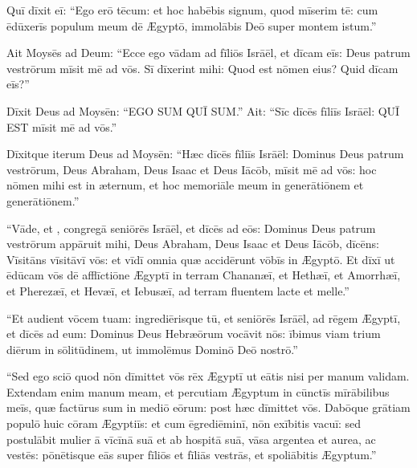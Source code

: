 Quī dīxit eī: ``Ego erō tēcum: et hoc habēbis signum,
quod mīserim tē: cum ēdūxerīs populum meum dē Ægyptō,
immolābis Deō super montem istum.''

Ait Moysēs ad Deum: ``Ecce ego vādam ad fīliōs Isrāēl,
et dīcam eīs: Deus patrum vestrōrum mīsit mē ad vōs.
Sī dīxerint mihi: Quod est nōmen eius? Quid dīcam eīs?''

Dīxit Deus ad Moysēn: ``EGO SUM QUĪ SUM.'' Ait: ``Sīc dīcēs fīliīs Isrāēl: QUĪ EST mīsit mē ad vōs.''

Dīxitque iterum Deus ad Moysēn: ``Hæc dīcēs fīliīs Isrāēl:
Dominus Deus patrum vestrōrum, Deus Abraham, Deus Isaac et Deus Iācōb,
 mīsit mē ad vōs: hoc nōmen mihi est in æternum,
et hoc memoriāle meum in generātiōnem et generātiōnem.''

``Vāde, et , congregā seniōrēs Isrāēl,
et dīcēs ad eōs: Dominus Deus patrum vestrōrum appāruit mihi,
Deus Abraham, Deus Isaac et Deus Iācōb,
dīcēns: Vīsitāns vīsitāvī vōs: et vīdī omnia quæ accidērunt vōbīs in Ægyptō.
Et dīxī ut ēdūcam vōs dē afflīctiōne Ægyptī in terram Chananæī,
et Hethæī, et Amorrhæī, et Pherezæī, et Hevæī, et Iebusæī,
ad terram fluentem lacte et melle.''

``Et audient vōcem tuam: ingrediērisque tū,
et seniōrēs Isrāēl, ad rēgem Ægyptī, et dīcēs ad eum:
Dominus Deus Hebræōrum vocāvit nōs:
ībimus viam trium diērum in sōlitūdinem,
ut immolēmus Dominō Deō nostrō.''

``Sed ego sciō quod nōn dīmittet vōs rēx Ægyptī
ut eātis nisi per manum validam.
Extendam enim manum meam, et percutiam Ægyptum
in cūnctīs mīrābilibus meīs, 
quæ factūrus sum in mediō eōrum:
post hæc dīmittet vōs.
Dabōque grātiam populō huic cōram Ægyptiīs:
et cum ēgrediēminī, nōn exībitis vacuī:
sed postulābit mulier ā vīcīnā suā
et ab hospitā suā, vāsa argentea et aurea, ac vestēs:
pōnētisque eās super fīliōs et fīliās vestrās, et spoliābitis Ægyptum.''
